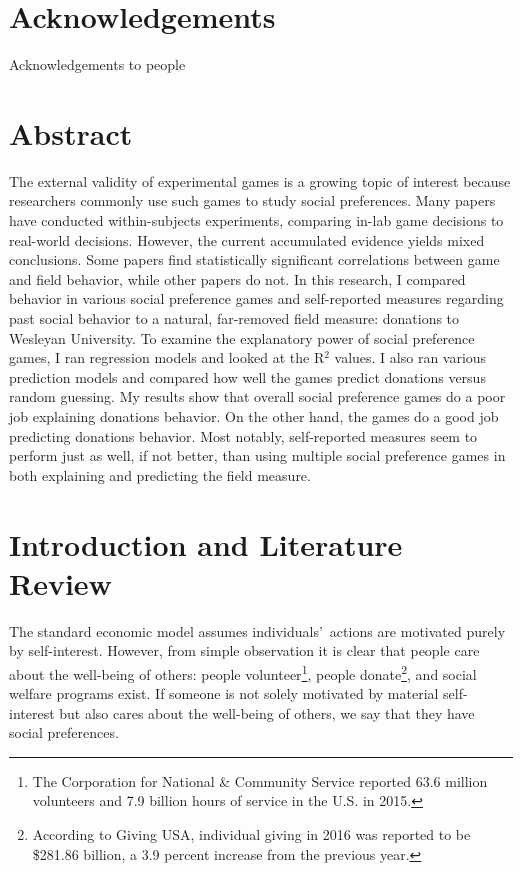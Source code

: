 \documentclass[12pt]{article}
\begin{document}


\newpage
\onehalfspacing
\tableofcontents
\thispagestyle{empty}


\newpage

\clearpage
{} 
\doublespacing
\section*{Acknowledgements}
Acknowledgements to people


\newpage

\section*{Abstract}


The external validity of experimental games is a growing topic of interest because researchers commonly use such games to study social preferences. Many papers have conducted within-subjects experiments, comparing in-lab game decisions to real-world decisions. However, the current accumulated evidence yields mixed conclusions. Some papers find statistically significant correlations between game and field behavior, while other papers do not. In this research, I compared behavior in various social preference games and self-reported measures regarding past social behavior to a natural, far-removed field measure: donations to Wesleyan University. To examine the explanatory power of social preference games, I ran regression models and looked at the R$^{2}$ values. I also ran various prediction models and compared how well the games predict donations versus random guessing. My results show that overall social preference games do a poor job explaining donations behavior. On the other hand, the games do a good job predicting donations behavior. Most notably, self-reported measures seem to perform just as well, if not better, than using multiple social preference games in both explaining and predicting the field measure.



\newpage


\doublespacing
\section{Introduction and Literature Review}

The standard economic model assumes individuals\rq \ actions are motivated purely by self-interest. However, from simple observation it is clear that people care about the well-being of others: people volunteer\footnote{The Corporation for National \& Community Service reported 63.6 million volunteers and 7.9 billion hours of service in the U.S. in 2015.}, people donate\footnote{According to Giving USA, individual giving in 2016 was reported to be \$281.86 billion, a 3.9 percent increase from the previous year.}, and social welfare programs exist. If someone is not solely motivated by material self-interest but also cares about the well-being of others, we say that they have social preferences. 
\end{document}

